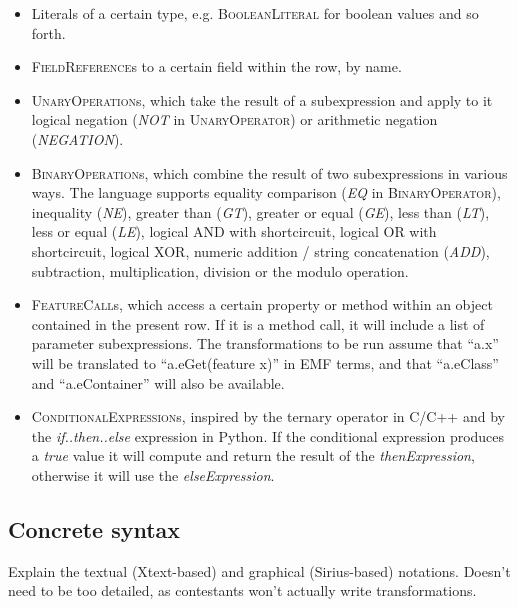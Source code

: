 \documentclass[a4paper]{scrartcl}
\newcommand*{\class}[1]{\textsc{#1}}
\begin{document}
\begin{itemize}
\item Literals of a certain type, e.g. \class{BooleanLiteral} for
  boolean values and so forth.

\item \class{FieldReference}s to a certain field within the row, by
  name.

\item \class{UnaryOperation}s, which take the result of a
  subexpression and apply to it logical negation (\emph{NOT} in
  \class{UnaryOperator}) or arithmetic negation (\emph{NEGATION}).

\item \class{BinaryOperation}s, which combine the result of two
  subexpressions in various ways. The language supports equality
  comparison (\emph{EQ} in \class{BinaryOperator}), inequality
  (\emph{NE}), greater than (\emph{GT}), greater or equal (\emph{GE}),
  less than (\emph{LT}), less or equal (\emph{LE}), logical AND with
  shortcircuit, logical OR with shortcircuit, logical XOR, numeric
  addition / string concatenation (\emph{ADD}), subtraction,
  multiplication, division or the modulo operation.

\item \class{FeatureCall}s, which access a certain property or method
  within an object contained in the present row. If it is a method
  call, it will include a list of parameter subexpressions. The
  transformations to be run assume that ``a.x'' will be translated to
  ``a.eGet(feature x)'' in EMF terms, and that ``a.eClass'' and
  ``a.eContainer'' will also be available.

\item \class{ConditionalExpression}s, inspired by the ternary operator
  in C/C++ and by the \emph{if..then..else} expression in Python. If
  the conditional expression produces a \emph{true} value it will
  compute and return the result of the \emph{thenExpression},
  otherwise it will use the \emph{elseExpression}.
\end{itemize}

\subsection{Concrete syntax}
\label{sec:csyn}

Explain the textual (Xtext-based) and graphical (Sirius-based)
notations. Doesn't need to be too detailed, as contestants won't
actually write transformations.
\end{document}
